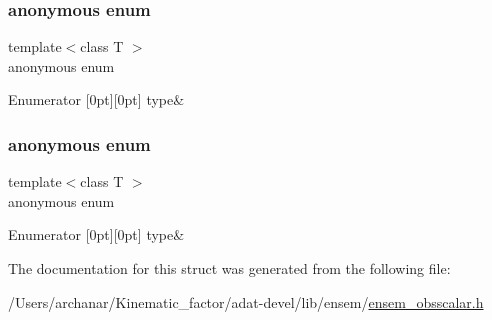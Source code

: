 \subsubsection{\texorpdfstring{anonymous enum}{anonymous enum}}
{\footnotesize\ttfamily template$<$class T $>$ \\
anonymous enum}

\begin{DoxyEnumFields}{Enumerator}
[0pt][0pt]{}\mbox{\label{structENSEM_1_1EnsbcIO_3_01OScalar_3_01T_01_4_01_4_a1ccd9d15830fe7ffeb9c21aff2aae6c6a1225eb40e728dd20bf5cc62fdb91e6ad}} 
type&\\
\hline

\end{DoxyEnumFields}
\mbox{\label{structENSEM_1_1EnsbcIO_3_01OScalar_3_01T_01_4_01_4_a1ccd9d15830fe7ffeb9c21aff2aae6c6}} 
\subsubsection{\texorpdfstring{anonymous enum}{anonymous enum}}
{\footnotesize\ttfamily template$<$class T $>$ \\
anonymous enum}

\begin{DoxyEnumFields}{Enumerator}
[0pt][0pt]{}\mbox{\label{structENSEM_1_1EnsbcIO_3_01OScalar_3_01T_01_4_01_4_a1ccd9d15830fe7ffeb9c21aff2aae6c6a1225eb40e728dd20bf5cc62fdb91e6ad}} 
type&\\
\hline

\end{DoxyEnumFields}


The documentation for this struct was generated from the following file\+:\begin{DoxyCompactItemize}
\item 
/\+Users/archanar/\+Kinematic\+\_\+factor/adat-\/devel/lib/ensem/\mbox{\hyperlink{adat-devel_2lib_2ensem_2ensem__obsscalar_8h}{ensem\+\_\+obsscalar.\+h}}\end{DoxyCompactItemize}
